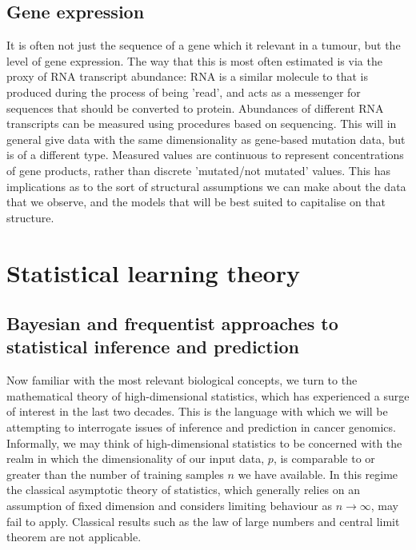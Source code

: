 \documentclass[thesis.tex]{subfiles}
\begin{document}
\subsection{Gene expression}
It is often not just the sequence of a gene which it relevant in a tumour, but the level of gene expression. The way that this is most often estimated is via the proxy of RNA transcript abundance: RNA is a similar molecule to  that is produced during the process of  being 'read', and acts as a messenger for sequences that should be converted to protein. Abundances of different RNA transcripts can be measured using procedures based on  sequencing. This will in general give data with the same dimensionality as gene-based mutation data, but is of a different type. Measured values are continuous to represent concentrations of gene products, rather than discrete 'mutated/not mutated' values. This has implications as to the sort of structural assumptions we can make about the data that we observe, and the models that will be best suited to capitalise on that structure.

\section{Statistical learning theory}

\subsection{Bayesian and frequentist approaches to statistical inference and prediction}

Now familiar with the most relevant biological concepts, we turn to the mathematical theory of high-dimensional statistics, which has experienced a surge of interest in the last two decades. This is the language with which we will be attempting to interrogate issues of inference and prediction in cancer genomics. Informally, we may think of high-dimensional statistics to be concerned with the realm in which the dimensionality of our input data, $p$, is comparable to or greater than the number of training samples $n$ we have available. In this regime the classical asymptotic theory of statistics, which generally relies on an assumption of fixed dimension and considers limiting behaviour as $n \rightarrow \infty$, may fail to apply. Classical results such as the law of large numbers and central limit theorem are not applicable. 
\end{document}
